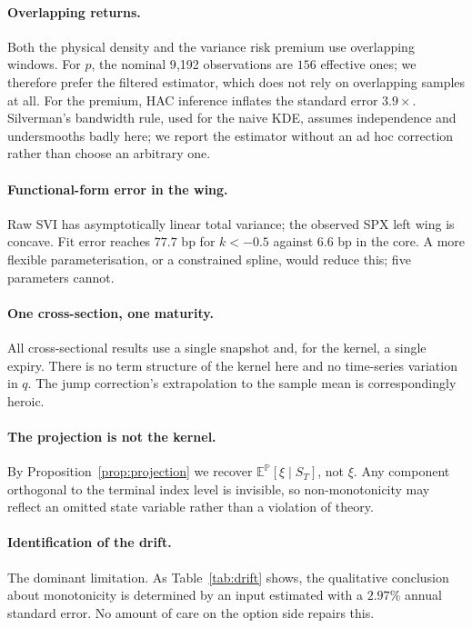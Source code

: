 \documentclass[11pt,a4paper]{article}
\theoremstyle{remark}
\newcommand{\PP}{\mathbb{P}}
\newcommand{\E}{\mathbb{E}}
\begin{document}
\paragraph{Overlapping returns.} Both the physical density and the variance risk
premium use overlapping windows. For $p$, the nominal 9{,}192 observations are
$156$ effective ones; we therefore prefer the filtered estimator, which does not
rely on overlapping samples at all. For the premium, HAC inference inflates the
standard error $3.9\times$. Silverman's bandwidth rule, used for the naive KDE,
assumes independence and undersmooths badly here; we report the estimator
without an ad hoc correction rather than choose an arbitrary one.

\paragraph{Functional-form error in the wing.} Raw SVI has asymptotically linear
total variance; the observed SPX left wing is concave. Fit error reaches $77.7$
bp for $k<-0.5$ against $6.6$ bp in the core. A more flexible parameterisation,
or a constrained spline, would reduce this; five parameters cannot.

\paragraph{One cross-section, one maturity.} All cross-sectional results use a
single snapshot and, for the kernel, a single expiry. There is no term structure
of the kernel here and no time-series variation in $q$. The jump correction's
extrapolation to the sample mean is correspondingly heroic.

\paragraph{The projection is not the kernel.} By
Proposition~\ref{prop:projection} we recover $\E^\PP[\xi\mid S_T]$, not $\xi$.
Any component orthogonal to the terminal index level is invisible, so
non-monotonicity may reflect an omitted state variable rather than a violation
of theory.

\paragraph{Identification of the drift.} The dominant limitation. As
Table~\ref{tab:drift} shows, the qualitative conclusion about monotonicity is
determined by an input estimated with a $2.97\%$ annual standard error. No
amount of care on the option side repairs this.
\end{document}
